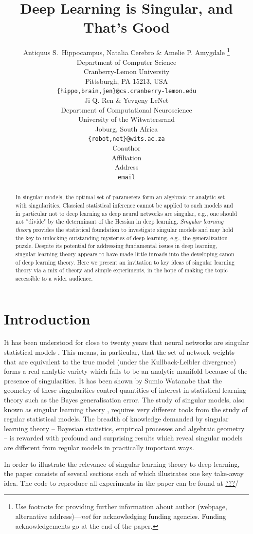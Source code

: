 \documentclass{article} %
\title{Deep Learning is Singular, and That's Good}
\author{Antiquus S.~Hippocampus, Natalia Cerebro \& Amelie P. Amygdale \thanks{ Use footnote for providing further information
about author (webpage, alternative address)---\emph{not} for acknowledging
funding agencies.  Funding acknowledgements go at the end of the paper.} \\
Department of Computer Science\\
Cranberry-Lemon University\\
Pittsburgh, PA 15213, USA \\
\texttt{\{hippo,brain,jen\}@cs.cranberry-lemon.edu} \\
\And
Ji Q. Ren \& Yevgeny LeNet \\
Department of Computational Neuroscience \\
University of the Witwatersrand \\
Joburg, South Africa \\
\texttt{\{robot,net\}@wits.ac.za} \\
\AND
Coauthor \\
Affiliation \\
Address \\
\texttt{email}
}
\begin{document}
\maketitle

\begin{abstract}
In singular models, the optimal set of parameters form an algebraic or analytic set with singularities. Classical statistical inference cannot be applied to such models and in particular not to deep learning as deep neural networks are singular, e.g., one should not ``divide" by the determinant of the Hessian in deep learning. \textit{Singular learning theory} provides the statistical foundation to investigate singular models and may hold the key to unlocking outstanding mysteries of deep learning, e.g., the generalization puzzle.
Despite its potential for addressing fundamental issues in deep learning, singular learning theory appears to have made little inroads into the developing canon of deep learning theory. Here we present an invitation to key ideas of singular learning theory via a mix of theory and simple experiments, in the hope of making the topic accessible to a wider audience. 
\end{abstract}

\section{Introduction}

It has been understood for close to twenty years that neural networks are singular statistical models \cite{amari_learning_2003, watanabe_almost_2007}. This means, in particular, that the set of network weights that are equivalent to the true model (under the Kullback-Leibler divergence) forms a real analytic variety which fails to be an analytic manifold because of the presence of singularities. It has been shown by Sumio Watanabe that the geometry of these singularities control quantities of interest in statistical learning theory such as the Bayes generalisation error. The study of singular models, also known as singular learning theory \citep{watanabe_algebraic_2009}, requires very different tools from the study of regular statistical models. The breadth of knowledge demanded by singular learning theory -- Bayesian statistics, empirical processes and algebraic geometry -- is rewarded with profound and surprising results which reveal singular models are different from regular models in practically important ways.

In order to illustrate the relevance of singular learning theory to deep learning, the paper consists of several sections each of which illustrates one key take-away idea. The code to reproduce all experiments in the paper can be found at \url{???}/
\end{document}
